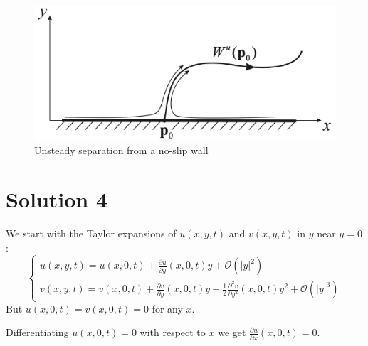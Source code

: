 \documentclass[twoside,10pt,a4paper]{article}
\begin{document}
\begin{figure}[H]
	\centering
	\includegraphics[scale=0.15]{Graphics/Q03D01.png}
	\caption{Unsteady separation from a no-slip wall}
\end{figure}

\section*{Solution 4}
We start with the Taylor expansions of $u(x,y,t)$ and $v(x,y,t)$ in $y$ near $y=0$:
\begin{equation}\label{S05E031}
	\begin{cases}
		\displaystyle u(x,y,t) = u(x,0,t) + \frac{\partial u}{\partial y}(x,0,t)y + \mathcal{O}(|y|^2) \\
		\displaystyle v(x,y,t) = v(x,0,t) + \frac{\partial v}{\partial y}(x,0,t)y + \frac{1}{2} \frac{\partial^2 v}{\partial y^2}(x,0,t)y^2 + \mathcal{O}(|y|^3)
	\end{cases}
\end{equation}
But $u(x,0,t) = v(x,0,t) = 0$ for any $x$.

Differentiating $u(x,0,t) = 0$ with respect to $x$ we get $\displaystyle \frac{\partial u}{\partial x}(x,0,t) = 0$.
\end{document}

